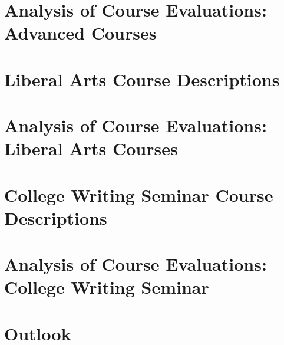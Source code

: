 \documentclass[../../main.tex]{subfiles}
\begin{document}
\section{Analysis of Course Evaluations: Advanced Courses}

\begin{flushleft}

\end{flushleft}

\section{Liberal Arts Course Descriptions}

\begin{flushleft}

\end{flushleft}

\section{Analysis of Course Evaluations: Liberal Arts Courses}

\begin{flushleft}

\end{flushleft}

\section{College Writing Seminar Course Descriptions}

\begin{flushleft}

\end{flushleft}

\section{Analysis of Course Evaluations: College Writing Seminar}

\begin{flushleft}

\end{flushleft}

\section{Outlook}

\begin{flushleft}

\end{flushleft}
\end{document}
